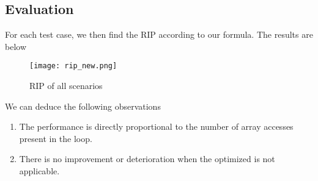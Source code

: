 
\subsection{Evaluation}

For each test case, we then find the RIP according to our formula. The results are below 

\begin{figure}[H]
	\centering
	\texttt{[image: rip\_new.png]}
	\caption{RIP of all scenarios}
	\label{RIP}	
\end{figure}

\pagebreak

We can deduce the following observations

\begin{enumerate}
	\item The performance is directly proportional to the number of array accesses present in the loop.
	\item There is no improvement or deterioration when the optimized is not applicable. 
\end{enumerate}
